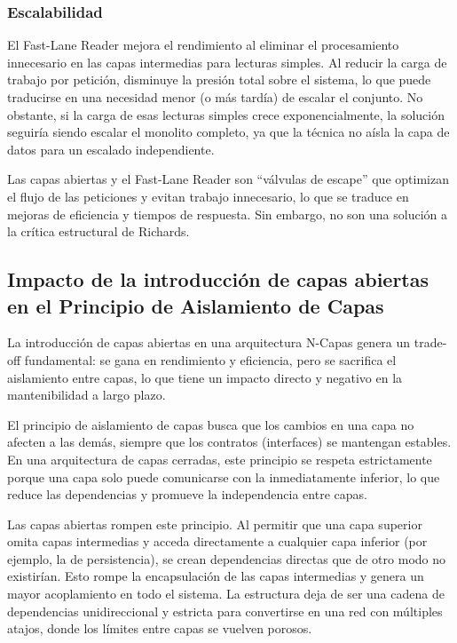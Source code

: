 \documentclass[12pt, a4paper]{article}
\begin{document}
        \subsubsection*{Escalabilidad}
        
        El Fast-Lane Reader mejora el rendimiento al eliminar el procesamiento innecesario en las capas intermedias para lecturas simples. Al reducir la carga de trabajo por petición, disminuye la presión total sobre el sistema, lo que puede traducirse en una necesidad menor (o más tardía) de escalar el conjunto. No obstante, si la carga de esas lecturas simples crece exponencialmente, la solución seguiría siendo escalar el monolito completo, ya que la técnica no aísla la capa de datos para un escalado independiente.

        Las capas abiertas y el Fast-Lane Reader son ``válvulas de escape'' que optimizan el flujo de las peticiones y evitan trabajo innecesario, lo que se traduce en mejoras de eficiencia y tiempos de respuesta. Sin embargo, no son una solución a la crítica estructural de Richards.
        
        \subsection{Impacto de la introducción de capas abiertas en el Principio de Aislamiento de Capas}
        
        La introducción de capas abiertas en una arquitectura N-Capas genera un trade-off fundamental: se gana en rendimiento y eficiencia, pero se sacrifica el aislamiento entre capas, lo que tiene un impacto directo y negativo en la mantenibilidad a largo plazo.

        El principio de aislamiento de capas busca que los cambios en una capa no afecten a las demás, siempre que los contratos (interfaces) se mantengan estables. En una arquitectura de capas cerradas, este principio se respeta estrictamente porque una capa solo puede comunicarse con la inmediatamente inferior, lo que reduce las dependencias y promueve la independencia entre capas.

        Las capas abiertas rompen este principio. Al permitir que una capa superior omita capas intermedias y acceda directamente a cualquier capa inferior (por ejemplo, la de persistencia), se crean dependencias directas que de otro modo no existirían. Esto rompe la encapsulación de las capas intermedias y genera un mayor acoplamiento en todo el sistema. La estructura deja de ser una cadena de dependencias unidireccional y estricta para convertirse en una red con múltiples atajos, donde los límites entre capas se vuelven porosos.
\end{document}
